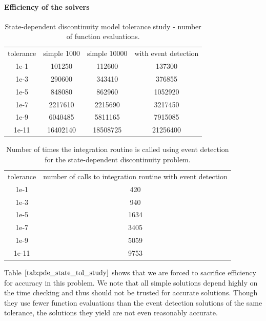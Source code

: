 \paragraph{Efficiency of the solvers}
\begin{table}[h]
\caption {State-dependent discontinuity model tolerance study - number of function evaluations.} 
\label{tab:pde_state_tol_study}
\begin{center}
\begin{tabular}{ c c c c } 
tolerance & simple 1000 & simple 10000 & with event detection \\ 
1e-1      &             101250   &              112600   &   137300 \\
1e-3      &             290600   &              343410   &   376855 \\
1e-5      &             848080   &              862960   &  1052920 \\
1e-7      &            2217610     &           2215690   &  3217450\\
1e-9      &            6040485     &           5811165   &  7915085  \\
1e-11     &           16402140     &          18508725   & 21256400 \\
\end{tabular}
\end{center}
\end{table}

\begin{table}[h]
\caption {Number of times the integration routine is called using event detection for the state-dependent discontinuity problem.} 
\label{tab:pde_state_tol_num_integrations}
\begin{center}
\begin{tabular}{ c c } 
tolerance & number of calls to integration routine with event detection \\ 
1e-1      &    420 \\
1e-3      &    940 \\
1e-5      & 1634 \\
1e-7      & 3405 \\
1e-9      & 5059 \\
1e-11     & 9753 \\
\end{tabular}
\end{center}
\end{table}

Table $\ref{tab:pde_state_tol_study}$ shows that we are forced to sacrifice efficiency for accuracy in this problem. We note that all simple solutions depend highly on the time checking and thus should not be trusted for accurate solutions. Though they use fewer function evaluations than the event detection solutions of the same tolerance, the solutions they yield are not even reasonably accurate. 

